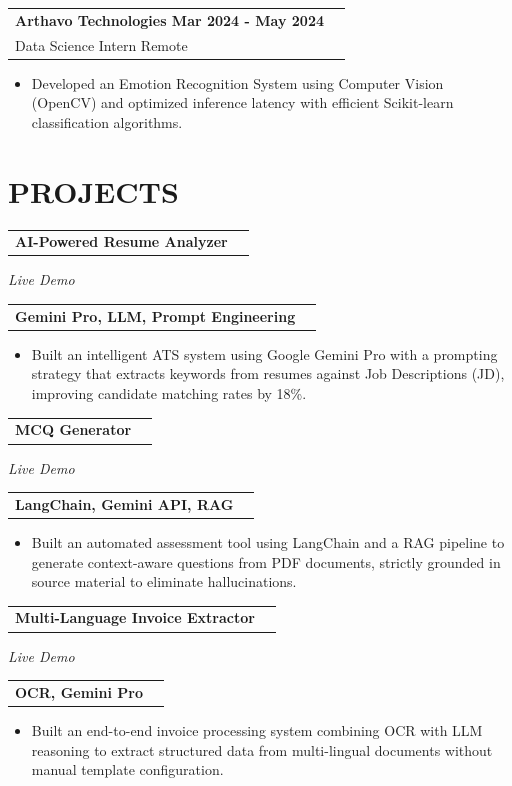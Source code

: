 \documentclass[a4paper,9.5pt]{extarticle}
\makeatletter
\newcommand{\resumeSubheading}[4]{
  \vspace{1.8pt}\nopagebreak[3]
  \begin{tabular*}{1.0\textwidth}[t]{l@{\extracolsep{\fill}}r}
    \textbf{#1} & \textit{\small #2} \\[-1.5pt]
    {\small #3} & \textit{\small #4}
  \end{tabular*}\nopagebreak[4]
}
\newcommand{\resumeProjectHeading}[2]{
  \vspace{1.8pt}\nopagebreak[3]
  \begin{tabular*}{1.0\textwidth}[t]{l@{\extracolsep{\fill}}r}
    #1 & \textit{\small #2}
  \end{tabular*}\nopagebreak[4]
}
\makeatother
\begin{document}
\resumeSubheading
  {Arthavo Technologies Mar 2024 - May 2024}{}
  {Data Science Intern Remote}{}
\nopagebreak[4]
\begin{itemize}[leftmargin=1.2em, itemsep=0.3pt, parsep=0pt, topsep=0.8pt, partopsep=0pt, label=\textbullet]
  \item Developed an Emotion Recognition System using Computer Vision (OpenCV) and optimized inference latency with efficient Scikit-learn classification algorithms.
\end{itemize}
\section{PROJECTS}
\resumeProjectHeading
  {\textbf{AI-Powered Resume Analyzer}}{}
{\small \textit{Live Demo}}\\[1pt]\nopagebreak[4]
\resumeProjectHeading
  {\textbf{Gemini Pro, LLM, Prompt Engineering}}{}
\begin{itemize}[leftmargin=1.2em, itemsep=0.3pt, parsep=0pt, topsep=0.8pt, partopsep=0pt, label=\textbullet]
  \item Built an intelligent ATS system using Google Gemini Pro with a prompting strategy that extracts keywords from resumes against Job Descriptions (JD), improving candidate matching rates by 18\%.
\end{itemize}
\resumeProjectHeading
  {\textbf{MCQ Generator}}{}
{\small \textit{Live Demo}}\\[1pt]\nopagebreak[4]
\resumeProjectHeading
  {\textbf{LangChain, Gemini API, RAG}}{}
\begin{itemize}[leftmargin=1.2em, itemsep=0.3pt, parsep=0pt, topsep=0.8pt, partopsep=0pt, label=\textbullet]
  \item Built an automated assessment tool using LangChain and a RAG pipeline to generate context-aware questions from PDF documents, strictly grounded in source material to eliminate hallucinations.
\end{itemize}
\resumeProjectHeading
  {\textbf{Multi-Language Invoice Extractor}}{}
{\small \textit{Live Demo}}\\[1pt]\nopagebreak[4]
\resumeProjectHeading
  {\textbf{OCR, Gemini Pro}}{}
\begin{itemize}[leftmargin=1.2em, itemsep=0.3pt, parsep=0pt, topsep=0.8pt, partopsep=0pt, label=\textbullet]
  \item Built an end-to-end invoice processing system combining OCR with LLM reasoning to extract structured data from multi-lingual documents without manual template configuration.
\end{itemize}
\end{document}
